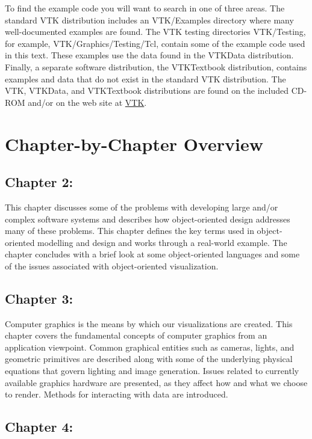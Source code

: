 To find the example code you will want to search in one of three areas. The standard VTK distribution includes an VTK/Examples directory where many well-documented examples are found. The VTK testing directories VTK/Testing, for example, VTK/Graphics/Testing/Tcl, contain some of the example code used in this text. These examples use the data found in the VTKData distribution. Finally, a separate software distribution, the VTKTextbook distribution, contains examples and data that do not exist in the standard VTK distribution. The VTK, VTKData, and VTKTextbook distributions are found on the included CD-ROM and/or on the web site at \href{https://www.vtk.org/}{VTK}.

\section{Chapter-by-Chapter Overview}

\subsection*{Chapter 2: }

This chapter discusses some of the problems with developing large and/or complex software systems and describes how object-oriented design addresses many of these problems. This chapter defines the key terms used in object-oriented modelling and design and works through a real-world example. The chapter concludes with a brief look at some object-oriented languages and some of the issues associated with object-oriented visualization.

\subsection*{Chapter 3: }

Computer graphics is the means by which our visualizations are created. This chapter covers the fundamental concepts of computer graphics from an application viewpoint. Common graphical entities such as cameras, lights, and geometric primitives are described along with some of the underlying physical equations that govern lighting and image generation. Issues related to currently available graphics hardware are presented, as they affect how and what we choose to render. Methods for interacting with data are introduced.

\subsection*{Chapter 4: }

